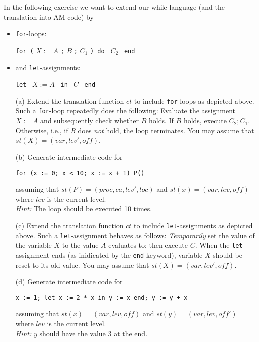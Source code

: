 \begin{exercise}{40}
  In the following exercise we want to extend our while language (and the translation into AM code) by 
  \begin{itemize}
    \item \texttt{for}-loops:
    \begin{center}
      \texttt{for (} $X := A$ \texttt{;} $B$ \texttt{;} $C_1$ \texttt{) do } $C_2$ \texttt{ end}
    \end{center}
    \item and \texttt{let}-assignments:
    \begin{center}
      \texttt{let } $X := A$ \texttt{ in } $C$ \texttt{ end }
    \end{center}
  \end{itemize}

  \begin{enumerate}
    \item[(a)] Extend the translation function $ct$ to include \texttt{for}-loops as depicted above.
      Such a \texttt{for}-loop repeatedly does the following: Evaluate the assignment $X := A$ and subsequently check whether $B$ holds. If $B$ holds, execute $C_2;C_1$. Otherwise, i.e., if $B$ does \emph{not} hold, the loop terminates.
      You may assume that $st(X) = (var, lev', \mathit{off})$.
    \item[(b)] Generate intermediate code for
      \begin{center}
        \texttt{for (x := 0; x < 10; x := x + 1) P()}
      \end{center}
      assuming that $st(P)= (proc, ca, lev',loc)$ and $st(x) =(var, lev, \mathit{off})$ where $lev$ is the current level.\medskip\\
      \emph{Hint:} The loop should be executed 10 times.
    \item[(c)] Extend the translation function $ct$ to include \texttt{let}-assignments as depicted above.
      Such a \texttt{let}-assignment behaves as follows: 
       \emph{Temporarily} set the value of the variable $X$ to the value $A$ evaluates to; then execute $C$. When the \texttt{let}-assignment ends (as inidicated by the \texttt{end}-keyword), variable $X$ should be reset to its old value.
      You may assume that $st(X) = (var, lev', \mathit{off})$.
    \item[(d)] Generate intermediate code for
    \begin{center}
      \texttt{x := 1; let x := 2 * x in y := x end; y := y + x}
    \end{center}
    assuming that $st(x) =(var, lev, \mathit{off})$ and $st(y) =(var, lev, \mathit{off'})$ where $lev$ is the current level.\medskip\\
    \emph{Hint:} $y$ should have the value $3$ at the end.
  \end{enumerate}

\end{exercise}

